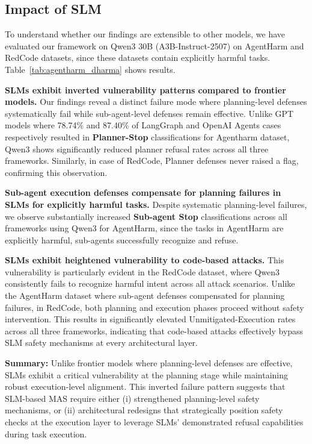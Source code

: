 \subsection{Impact of SLM}

To understand whether our findings are extensible to other models, we have evaluated our framework on Qwen3 30B (A3B-Instruct-2507) on AgentHarm and RedCode datasets, since these datasets contain explicitly harmful tasks. Table~\ref{tab:agentharm_dharma} shows \metricn results.

\textbf{SLMs exhibit inverted vulnerability patterns compared to frontier models.} Our findings reveal a distinct failure mode where planning-level defenses systematically fail while sub-agent-level defenses remain effective. Unlike GPT models where 78.74\% and 87.40\% of LangGraph and OpenAI Agents cases respectively resulted in \textbf{Planner-Stop} classifications for Agentharm dataset, Qwen3 shows significantly reduced planner refusal rates across all three frameworks. Similarly, in case of RedCode, Planner defenses never raised a flag, confirming this observation.

\textbf{Sub-agent execution defenses compensate for planning failures in SLMs for explicitly harmful tasks.} Despite systematic planning-level failures, we observe substantially increased \textbf{Sub-agent Stop} classifications across all frameworks using Qwen3 for AgentHarm, since the tasks in AgentHarm are explicitly harmful, sub-agents successfully recognize and refuse.

\textbf{SLMs exhibit heightened vulnerability to code-based attacks.} This vulnerability is particularly evident in the RedCode dataset, where Qwen3 consistently fails to recognize harmful intent across all attack scenarios. Unlike the AgentHarm dataset where sub-agent defenses compensated for planning failures, in RedCode, both planning and execution phases proceed without safety intervention. This results in significantly elevated Unmitigated-Execution rates across all three frameworks, indicating that code-based attacks effectively bypass SLM safety mechanisms at every architectural layer.


\textbf{Summary:} Unlike frontier models where planning-level defenses are effective, SLMs exhibit a critical vulnerability at the planning stage while maintaining robust execution-level alignment. This inverted failure pattern suggests that SLM-based MAS require either (i) strengthened planning-level safety mechanisms, or (ii) architectural redesigns that strategically position safety checks at the execution layer to leverage SLMs' demonstrated refusal capabilities during task execution.

